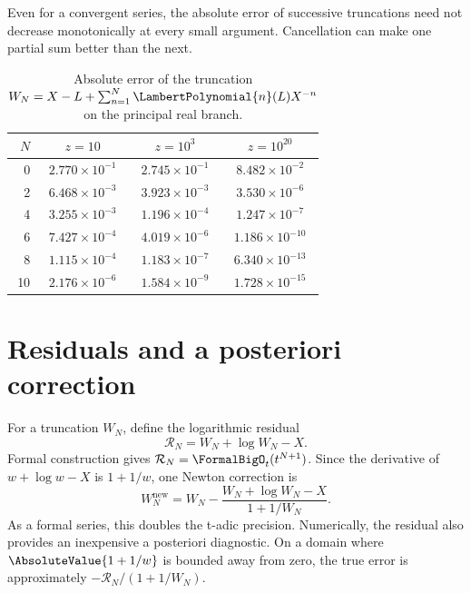 \documentclass[11pt,openany]{book}
\theoremstyle{definition}
\theoremstyle{plain}
\theoremstyle{remark}
\begin{document}
Even for a convergent series, the absolute error of successive truncations need
not decrease monotonically at every small argument.  Cancellation can make one
partial sum better than the next.

\begin{table}[htbp]
\centering
\caption{Absolute error of the truncation
\(W_N=X-L+\sum_{n=1}^N\LambertPolynomial{n}(L)X^{-n}\) on the principal real branch.}
\label{tab:W-errors}
\begin{tabular}{@{}rccc@{}}
\toprule
\(N\) & \(z=10\) & \(z=10^3\) & \(z=10^{20}\) \\
\midrule
0  & \(2.770\times10^{-1}\) & \(2.745\times10^{-1}\) & \(8.482\times10^{-2}\) \\
2  & \(6.468\times10^{-3}\) & \(3.923\times10^{-3}\) & \(3.530\times10^{-6}\) \\
4  & \(3.255\times10^{-3}\) & \(1.196\times10^{-4}\) & \(1.247\times10^{-7}\) \\
6  & \(7.427\times10^{-4}\) & \(4.019\times10^{-6}\) & \(1.186\times10^{-10}\) \\
8  & \(1.115\times10^{-4}\) & \(1.183\times10^{-7}\) & \(6.340\times10^{-13}\) \\
10 & \(2.176\times10^{-6}\) & \(1.584\times10^{-9}\) & \(1.728\times10^{-15}\) \\
\bottomrule
\end{tabular}
\end{table}

\section{Residuals and a posteriori correction}
For a truncation \(W_N\), define the logarithmic residual
\begin{equation}\label{eq:W-residual}
 \mathcal R_N=W_N+\log W_N-X.
\end{equation}
Formal construction gives \(\mathcal R_N=\FormalBigO_t(t^{N+1})\).  Since the derivative
of \(w+\log w-X\) is \(1+1/w\), one Newton correction is
\begin{equation}\label{eq:W-newton-correction}
 W_N^{\mathrm{new}}
 =W_N-\frac{W_N+\log W_N-X}{1+1/W_N}.
\end{equation}
As a formal series, this doubles the t-adic precision.  Numerically, the
residual also provides an inexpensive a posteriori diagnostic.  On a domain
where \(\AbsoluteValue{1+1/w}\) is bounded away from zero, the true error is approximately
\(-\mathcal R_N/(1+1/W_N)\).
\end{document}
